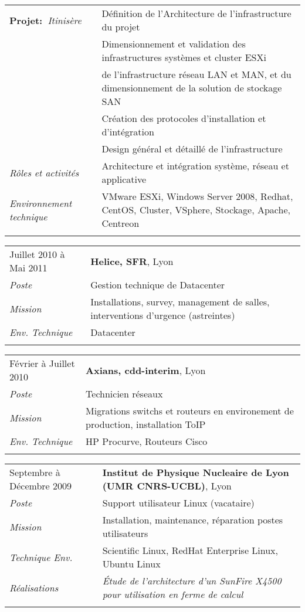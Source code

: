 \documentclass[a4paper,8pt]{article}
\begin{document}
\begin{tabular}{P{3.5cm}|p{13cm}}
\textbf{Projet:~}\textit{Itinisère}	& Définition de l’Architecture de l'infrastructure du projet\\
				& Dimensionnement et validation des infrastructures systèmes et cluster ESXi\\
				& de l'infrastructure réseau LAN et MAN, et du dimensionnement de la solution de stockage SAN\\
				& Création des protocoles d'installation et d'intégration\\
				& Design général et détaillé de l'infrastructure\\
\textsl{Rôles et activités}	& Architecture et intégration système, réseau et applicative\\
\textsl{Environnement technique} & VMware ESXi, Windows Server 2008, Redhat, CentOS, Cluster, VSphere, Stockage, Apache, Centreon\\
 & \\
\end{tabular}

\begin{tabular}{P{3.5cm}|p{13cm}}
Juillet 2010 à Mai 2011	& \textbf{Helice, SFR}, Lyon\\
\textsl{Poste}			& Gestion technique de Datacenter\\
\textsl{Mission}		& Installations, survey, management de salles, interventions d'urgence (astreintes)\\
\textsl{Env. Technique}		& Datacenter\\
 & \\
\end{tabular}

\begin{tabular}{P{3.5cm}|p{13cm}}
Février à Juillet 2010	& \textbf{Axians, cdd-interim}, Lyon\\
\textsl{Poste}	 		& Technicien réseaux\\
\textsl{Mission}		& Migrations switchs et routeurs en environement de production, installation ToIP\\
\textsl{Env. Technique}		& HP Procurve, Routeurs Cisco\\
 & \\
\end{tabular}

\begin{tabular}{P{3.5cm}|p{13cm}}
Septembre à Décembre 2009	& \textbf{Institut de Physique Nucleaire de Lyon (UMR CNRS-UCBL)}, Lyon\\
\textsl{Poste}	 		& Support utilisateur Linux (vacataire)\\
\textsl{Mission} 		& Installation, maintenance, réparation postes utilisateurs\\
\textsl{Technique Env.}		& Scientific Linux, RedHat Enterprise Linux, Ubuntu Linux\\
\textsl{Réalisations}		& \textsl{\'{E}tude de l'architecture d'un SunFire X4500 pour utilisation en ferme de calcul}\\
 & \\
\end{tabular}
\end{document}
